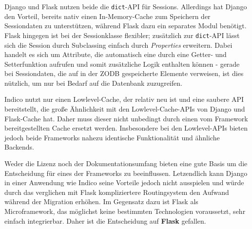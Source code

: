 Django und Flask nutzen beide die \lstinline{dict}-API für Sessions. Allerdings hat Django den
Vorteil, bereits nativ einen In-Memory-Cache zum Speichern der Sessiondaten zu unterstützen, während
Flask dazu ein separates Modul benötigt. Flask hingegen ist bei der Sessionklasse flexibler;
zusätzlich zur \lstinline{dict}-API lässt sich die Session durch Subclassing einfach durch
\emph{Properties} erweitern. Dabei handelt es sich um Attribute, die automatisch eine durch eine
Getter- und Setterfunktion aufrufen und somit zusätzliche Logik enthalten können - gerade bei
Sessiondaten, die auf in der ZODB gespeicherte Elemente verweisen, ist dies nützlich, um nur bei
Bedarf auf die Datenbank zuzugreifen.

Indico nutzt nur einen Lowlevel-Cache, der relativ neu ist und eine saubere API bereitstellt, die
große Ähnlichkeit mit den Lowlevel-Cache-APIs von Django und Flask-Cache hat. Daher muss dieser
nicht unbedingt durch einen vom Framework bereitgestellten Cache ersetzt werden. Insbesondere bei
den Lowlevel-APIs bieten jedoch beide Frameworks nahezu identische Funktionalität und ähnliche
Backends.

Weder die Lizenz noch der Dokumentationsumfang bieten eine gute Basis um die Entscheidung für eines
der Frameworks zu beeinflussen. Letzendlich kann Django in einer Anwendung wie Indico seine Vorteile
jedoch nicht ausspielen und würde durch das verglichen mit Flask kompliziertere Routingsystem den
Aufwand während der Migration erhöhen. Im Gegensatz dazu ist Flask als Microframework, das möglichst
keine bestimmten Technologien voraussetzt, sehr einfach integrierbar. Daher ist die Entscheidung auf
\textbf{Flask} gefallen.
